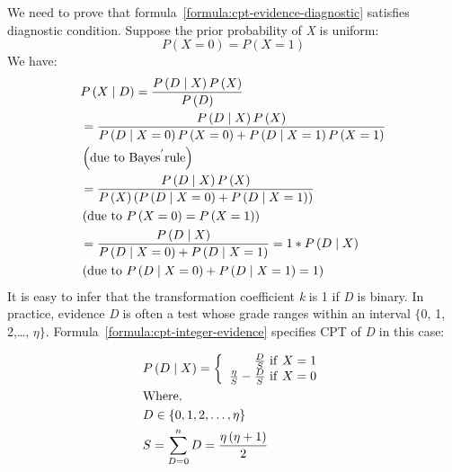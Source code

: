 \documentclass{article}
\numberwithin{equation}{section}
\numberwithin{figure}{section}
\numberwithin{table}{section}
\begin{document}
We need to prove that formula~\ref{formula:cpt-evidence-diagnostic} satisfies diagnostic condition. Suppose the prior probability of \textit{X} is uniform:
\[P\left(X=0\right)=P\left(X=1\right)\] 
We have:
\begin{align*}
&P\left(X\mathrel{\left|\vphantom{X D}\right.\kern-\nulldelimiterspace}D\right)=\frac{P\left(D\mathrel{\left|\vphantom{D X}\right.\kern-\nulldelimiterspace}X\right)P\left(X\right)}{P\left(D\right)}\\
&=\frac{P\left(D\mathrel{\left|\vphantom{D X}\right.\kern-\nulldelimiterspace}X\right)P\left(X\right)}{P\left(D\mathrel{\left|\vphantom{D X=0}\right.\kern-\nulldelimiterspace}X=0\right)P\left(X=0\right)+P\left(D\mathrel{\left|\vphantom{D X=1}\right.\kern-\nulldelimiterspace}X=1\right)P\left(X=1\right)}\\
&\left(\mathrm{due\ to\ Baye}{\mathrm{s}}^{\mathrm{'}}\mathrm{rule}\right)\\
&=\frac{P\left(D\mathrel{\left|\vphantom{D X}\right.\kern-\nulldelimiterspace}X\right)P\left(X\right)}{P\left(X\right)\left(P\left(D\mathrel{\left|\vphantom{D X=0}\right.\kern-\nulldelimiterspace}X=0\right)+P\left(D\mathrel{\left|\vphantom{D X=1}\right.\kern-\nulldelimiterspace}X=1\right)\right)}\\
&\left(\mathrm{due\ to}\ P\left(X=0\right)=P\left(X=1\right)\right)\\
&=\frac{P\left(D\mathrel{\left|\vphantom{D X}\right.\kern-\nulldelimiterspace}X\right)}{P\left(D\mathrel{\left|\vphantom{D X=0}\right.\kern-\nulldelimiterspace}X=0\right)+P\left(D\mathrel{\left|\vphantom{D X=1}\right.\kern-\nulldelimiterspace}X=1\right)}=1*P\left(D\mathrel{\left|\vphantom{D X}\right.\kern-\nulldelimiterspace}X\right)\\
&\left(\mathrm{due\ to}\ P\left(D\mathrel{\left|\vphantom{D X=0}\right.\kern-\nulldelimiterspace}X=0\right)+P\left(D\mathrel{\left|\vphantom{D X=1}\right.\kern-\nulldelimiterspace}X=1\right)=1\right)
\end{align*}
It is easy to infer that the transformation coefficient \textit{k} is 1 if \textit{D} is binary. In practice, evidence \textit{D} is often a test whose grade ranges within an interval $\{$0, 1, 2,{\dots}, \textit{$\eta$}$\}$. Formula~\ref{formula:cpt-integer-evidence} specifies CPT of \textit{D} in this case:

\begin{equation}
\begin{split}
&P\left(D\mathrel{\left|\vphantom{D X}\right.\kern-\nulldelimiterspace}X\right)=\left\{ \begin{array}{r}
\frac{D}{S}\ \mathrm{if}\ X=1 \\ 
\frac{\eta }{S}-\frac{D}{S}\ \mathrm{if}\ X=0 \end{array}
\right.\\
&\mathrm{Where,}\\
&D\in \left\{0,1,2,\dots ,\eta \right\}\\
&S=\sum^n_{D=0}{D}=\frac{\eta \left(\eta +1\right)}{2}
\end{split}
\label{formula:cpt-integer-evidence}
\end{equation}
\end{document}

